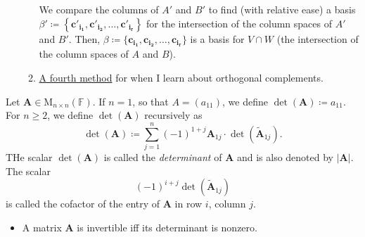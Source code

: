 \documentclass[../Notes.tex]{subfiles}
\begin{document}
\begin{stbox}{}
\begin{itemize}
\begin{enumerate}
        We compare the columns of \(A'\) and \(B'\) to find (with relative ease) a basis \(\beta'\coloneq\left\{\mathbf{c'_{i_1}},\mathbf{c'_{i_2}},\dots,\mathbf{c'_{i_r}}\right\}\) for the intersection of the column spaces of \(A'\) and \(B'\). Then, \(\beta\coloneq\{\mathbf{c_{i_1}},\mathbf{c_{i_2}},\dots,\mathbf{c_{i_r}}\}\) is a basis for \(V\cap W\) (the intersection of the column spaces of \(A\) and \(B\)).
        \item \href{https://math.stackexchange.com/a/4837004}{A fourth method} for when I learn about orthogonal complements. 
        \end{enumerate}
    \end{itemize}
\end{stbox}
\begin{definition}{}{}
    Let \(\mathbf{A}\in \mathrm{M}_{n\times n}(\mathbb{F})\). If \(n=1\), so that \(A=(a_11)\), we define \(\det(\mathbf{A})\coloneq a_11\). For \(n\geq 2\), we define \(\det(\mathbf{A})\) recursively as 
    \[\det(\mathbf{A})\coloneq \sum_{j=1}^{n}{(-1)^{1+j}}\mathbf{A}_{1j}\cdot \det(\widetilde{\mathbf{A}}_{1j}).\]
    THe scalar \(\det(\mathbf{A})\) is called the \emph{determinant} of \(\mathbf{A}\) and is also denoted by \(\lvert \mathbf{A} \rvert\). The scalar 
    \[(-1)^{i+j}\det(\widetilde{\mathbf{A}}_{1j})\]
    is called the cofactor of the entry of \(\mathbf{A}\) in row \(i\), column \(j\).
\end{definition}
\begin{stbox}{}
    \begin{itemize}
        \item A matrix \(\mathbf{A}\) is invertible iff its determinant is nonzero. 
    \end{itemize}
\end{stbox}
\end{document}

